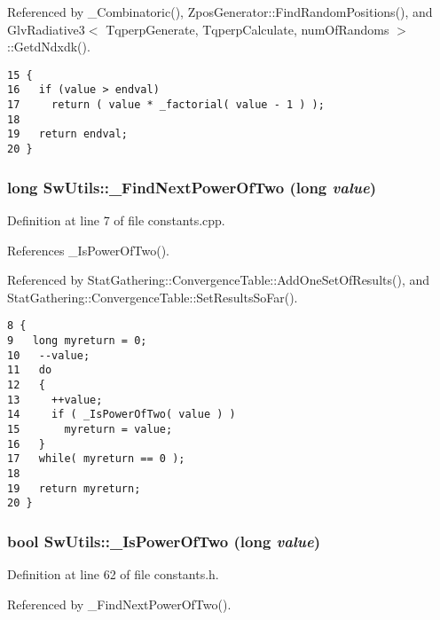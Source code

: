 Referenced by \_\-Combinatoric(), ZposGenerator::FindRandomPositions(), and GlvRadiative3$<$ TqperpGenerate, TqperpCalculate, numOfRandoms $>$::GetdNdxdk().

\begin{Code}\begin{verbatim}15 {
16   if (value > endval)
17     return ( value * _factorial( value - 1 ) );
18 
19   return endval;
20 }
\end{verbatim}
\end{Code}


\subsubsection{\setlength{\rightskip}{0pt plus 5cm}long SwUtils::\_\-FindNextPowerOfTwo (long {\em value})}\label{namespaceSwUtils_26183064bbbb36f547635316aec1dd97}




Definition at line 7 of file constants.cpp.

References \_\-IsPowerOfTwo().

Referenced by StatGathering::ConvergenceTable::AddOneSetOfResults(), and StatGathering::ConvergenceTable::SetResultsSoFar().

\begin{Code}\begin{verbatim}8 {
9   long myreturn = 0;
10   --value;
11   do
12   {
13     ++value;
14     if ( _IsPowerOfTwo( value ) )
15       myreturn = value;
16   }
17   while( myreturn == 0 );
18 
19   return myreturn;
20 }
\end{verbatim}
\end{Code}


\subsubsection{\setlength{\rightskip}{0pt plus 5cm}bool SwUtils::\_\-IsPowerOfTwo (long {\em value})\hspace{0.3cm}{\tt  [inline]}}\label{namespaceSwUtils_a958298ae1d796946e5784f3339ffba1}




Definition at line 62 of file constants.h.

Referenced by \_\-FindNextPowerOfTwo().

